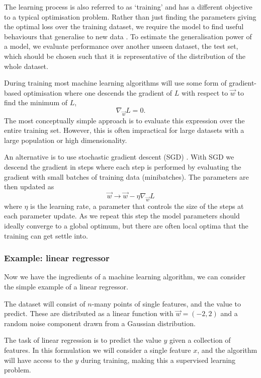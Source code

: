 The learning process is also referred to as `training' and has a different objective to a typical optimisation problem. Rather than just finding the parameters giving the optimal loss over the training dataset, we require the model to find useful behaviours that generalise to new data \cite{DeepLearningBook}. 
To estimate the generalisation power of a model, we evaluate performance over another unseen dataset, the test set, which should be chosen such that it is representative of the distribution of the whole dataset.


During training most machine learning algorithms will use some form of gradient-based optimisation where one descends the gradient of $L$ with respect to $\vec{w}$ to find the minimum of $L$,
\begin{equation}
    \nabla_{\vec{w}}L = 0.
\end{equation}
The most conceptually simple approach is to evaluate this expression over the entire training set. However, this is often impractical for large datasets with a large population or high dimensionality. 

An alternative is to use stochastic gradient descent (SGD) \cite{DeepLearningBook}. With SGD we descend the gradient in steps where each step is performed by evaluating the gradient with small batches of training data (minibatches). 
The parameters are then updated as
\begin{equation}
    \vec{w} \rightarrow \vec{w} - \eta\nabla_{\vec{w}}L
\end{equation}
where $\eta$ is the learning rate, a parameter that controls the size of the steps at each parameter update. As we repeat this step the model parameters should ideally converge to a global optimum, but there are often local optima that the training can get settle into. 


\subsubsection{Example: linear regressor}
Now we have the ingredients of a machine learning algorithm, we can consider the simple example of a linear regressor. 

The dataset will consist of $n$-many points of single features, and the value to predict. These are distributed as a linear function with $\vec{w} = (-2,2)$ and a random noise component drawn from a Gaussian distribution.

The task of linear regression is to predict the value $y$ given a collection of features. In this formulation we will consider a single feature $x$, and the algorithm will have access to the $y$ during training, making this a supervised learning problem. 

